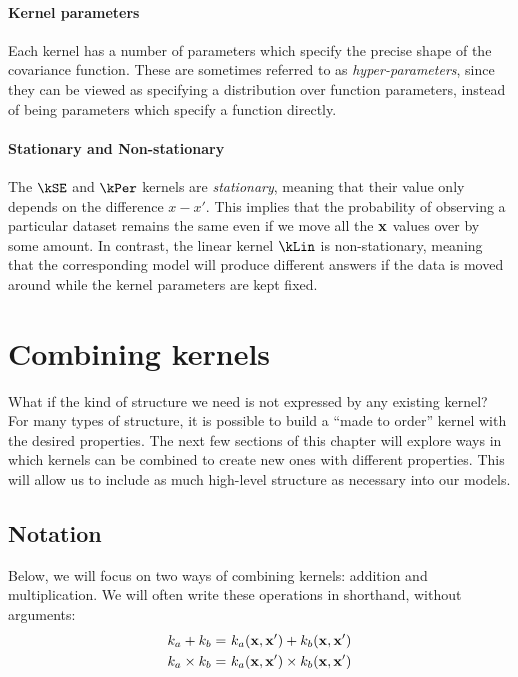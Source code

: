 \paragraph{Kernel parameters}
Each kernel has a number of parameters which specify the precise shape of the covariance function.
These are sometimes referred to as \emph{hyper-parameters}, since they can be viewed as specifying a distribution over function parameters, instead of being parameters which specify a function directly.


\paragraph{Stationary and Non-stationary}
The $\kSE$ and $\kPer$ kernels are \emph{stationary}, meaning that their value only depends on the difference $x-x'$.  This implies that the probability of observing a particular dataset remains the same even if we move all the ${\bf{x}}$ values over by some amount.
In contrast, the linear kernel $\kLin$ is non-stationary, meaning that the corresponding \gp{} model will produce different answers if the data is moved around while the kernel parameters are kept fixed.




\section{Combining kernels}

What if the kind of structure we need is not expressed by any existing kernel?
For many types of structure, it is possible to build a ``made to order'' kernel with the desired properties.
The next few sections of this chapter will explore ways in which kernels can be combined to create new ones with different properties.
This will allow us to include as much high-level structure as necessary into our models.


\subsection{Notation}

Below, we will focus on two ways of combining kernels: addition and multiplication.
We will often write these operations in shorthand, without arguments:
%
\begin{align}
k_a + k_b =& \,\, k_a({\bf{x}}, {\bf{x}}') + k_b( {\bf{x}}, {\bf{x}}')\\
k_a \times k_b =& \,\, k_a({\bf{x}}, {\bf{x}}') \times k_b({\bf{x}}, {\bf{x}}')
\end{align}

